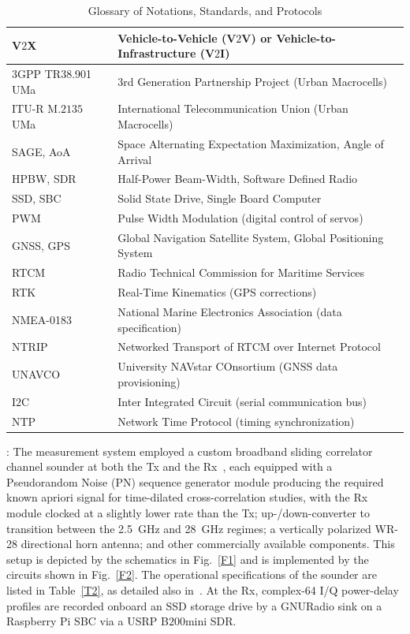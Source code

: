 \documentclass[10pt, twocolumn]{IEEEtran}
\begin{document}
\begin{table} [tb]
	\centering
	\scriptsize
	\begin{tabular}{|l||l|}
		\hline
		V$2$X & Vehicle-to-Vehicle (V$2$V) or Vehicle-to-Infrastructure (V$2$I)\\
		\hline
		$3$GPP TR38.901 UMa & $3$rd Generation Partnership Project (Urban Macrocells)\\
		\hline
		ITU-R M$.2135$ UMa & International Telecommunication Union (Urban Macrocells)\\
		\hline
		SAGE, AoA & Space Alternating Expectation Maximization, Angle of Arrival\\
		\hline
		HPBW, SDR & Half-Power Beam-Width, Software Defined Radio\\
		\hline
		SSD, SBC & Solid State Drive, Single Board Computer\\
		\hline
		PWM & Pulse Width Modulation (digital control of servos)\\
		\hline
		GNSS, GPS & Global Navigation Satellite System, Global Positioning System\\
		\hline
		RTCM & Radio Technical Commission for Maritime Services\\
		\hline
		RTK & Real-Time Kinematics (GPS corrections)\\
		\hline
		NMEA-0183 & National Marine Electronics Association (data specification)\\
		\hline
		NTRIP & Networked Transport of RTCM over Internet Protocol\\
		\hline
		UNAVCO & University NAVstar COnsortium (GNSS data provisioning)\\
		\hline
		I$2$C & Inter Integrated Circuit (serial communication bus)\\
		\hline
		NTP & Network Time Protocol (timing synchronization)\\
		\hline
	\end{tabular}
	\vspace{-1mm}
	\caption{Glossary of Notations, Standards, and Protocols}
	\label{T1}
\end{table}

: The measurement system employed a custom broadband sliding correlator channel sounder at both the Tx and the Rx~\cite{Purdue}, each equipped with a Pseudorandom Noise (PN) sequence generator module producing the required known apriori signal for time-dilated cross-correlation studies, with the Rx module clocked at a slightly lower rate than the Tx; up-/down-converter to transition between the \SI{2.5}{\giga\hertz} and \SI{28}{\giga\hertz} regimes; a vertically polarized WR-28 directional horn antenna; and other commercially available components. This setup is depicted by the schematics in Fig.~\ref{F1} and is implemented by the circuits shown in Fig.~\ref{F2}. The operational specifications of the sounder are listed in Table~\ref{T2}, as detailed also in~\cite{Purdue}. At the Rx, complex-\SI{64}{} I/Q power-delay profiles are recorded onboard an SSD storage drive by a GNURadio sink on a Raspberry Pi SBC via a USRP B$200$mini SDR.
\end{document}
